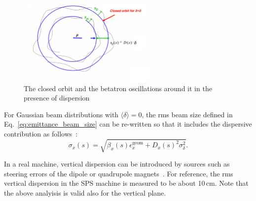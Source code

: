\begin{figure}[!h] %
    \centering         
    \includegraphics[width=0.6\textwidth]{images/Ch2/closed_orbit_dispersion.png}
        \caption{The closed orbit and the betatron oscillations around it in the presence of dispersion~\cite{Holzer_summer_students_introduction}}
        \label{fig:closed_orbit_Dx}
 \end{figure}



For Gaussian beam distributions with $\langle \delta \rangle=0$, the rms beam size defined in Eq.~\eqref{eq:emittance_beam_size} can be re-written so that it includes the dispersive contribution as follows~\cite{wolski2014}: 
\begin{equation}\label{eq:emittance_beam_size_dispersion}
    \sigma_x(s) = \sqrt{\beta_x(s) \epsilon^{\mathrm{geom}}_x+ D_x(s)^2\sigma_\delta^2}.
\end{equation}

In a real machine, vertical dispersion can be introduced by sources such as steering errors of the dipole or quadrupole magnets~\cite{Wolski_uspas}. For reference, the rms vertical dispersion in the SPS machine is measured to be about 10\,cm. Note that the above analyisis is valid also for the vertical plane.


